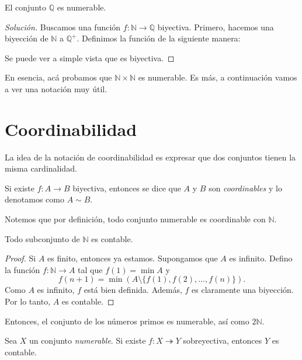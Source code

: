 \begin{example}
	El conjunto $\mathbb{Q}$ es numerable.
\end{example}

\begin{proof}[Solución]
	Buscamos una función $f : \mathbb{N} \to \mathbb{Q}$ biyectiva. Primero, hacemos una biyección de $\mathbb{N}$ a $\mathbb{Q}^+$. Definimos la función de la siguiente manera:
	\begin{center}
		
	\end{center}
	Se puede ver a simple vista que es biyectiva.
\end{proof}

En esencia, acá probamos que $\mathbb{N} \times \mathbb{N}$ es numerable. Es más, a continuación vamos a ver una notación muy útil.

\section{Coordinabilidad}

La idea de la notación de coordinabilidad es expresar que dos conjuntos tienen la misma cardinalidad.

\begin{definition}
	Si existe $f: A \to  B$ biyectiva, entonces se dice que $A$ y $B$ son \emph{coordinables} y lo denotamos como $A \sim B$.
\end{definition}

Notemos que por definición, todo conjunto numerable es coordinable con $\mathbb{N}$.

\begin{lemma}
	Todo subconjunto de $\mathbb{N}$ es contable.
\end{lemma}

\begin{proof}
	Si $A$ es finito, entonces ya estamos. Supongamos que $A$ es infinito. Defino la función $f: \mathbb{N} \to A$ tal que $f(1) = \min A$ y
	\begin{equation*}
		f(n+1) = \min (A \setminus \{ f(1), f(2), \dots, f(n) \}).
	\end{equation*}
	Como $A$ es infinito, $f$ está bien definida. Además, $f$ es claramente una biyección. Por lo tanto, $A$ es contable.
\end{proof}

Entonces, el conjunto de los números primos es numerable, así como $2 \mathbb{N}$.

\begin{proposition}
	Sea $X$ un conjunto \textit{numerable}. Si existe $f: X \twoheadrightarrow Y$ sobreyectiva, entonces $Y$ es contable.
\end{proposition}

